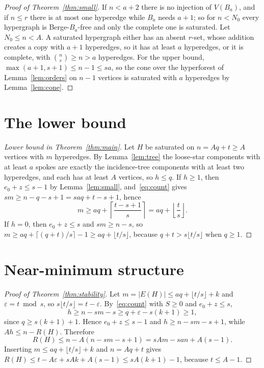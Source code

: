 \documentclass[11pt]{article}
\theoremstyle{definition}
\theoremstyle{remark}
\begin{document}
\begin{proof}[Proof of Theorem~\ref{thm:small}]
If $n<a+2$ there is no injection of $V(B_a)$, and if $n\le r$ there is at
most one hyperedge while $B_a$ needs $a+1$; so for $n<N_0$ every
hypergraph is Berge-$B_a$-free and only the complete one is saturated. Let
$N_0\le n<A$. A saturated hypergraph either has an absent $r$-set, whose
addition creates a copy with $a+1$ hyperedges, so it has at least $a$
hyperedges, or it is complete, with $\binom nr\ge n>a$ hyperedges. For the
upper bound, $\max(a+1,s+1)\le n-1\le sa$, so the cone over the hyperforest
of Lemma~\ref{lem:orders} on $n-1$ vertices is saturated with $a$
hyperedges by Lemma~\ref{lem:cone}.
\end{proof}

\section{The lower bound}

\begin{proof}[Lower bound in Theorem~\ref{thm:main}]
Let $H$ be saturated on $n=Aq+t\ge A$ vertices with $m$ hyperedges. By
Lemma~\ref{lem:tree} the loose-star components with at least $a$ spokes
are exactly the incidence-tree components with at least two hyperedges, and
each has at least $A$ vertices, so $h\le q$. If $h\ge1$, then
$e_0+z\le s-1$ by Lemma~\ref{lem:small}, and~\eqref{eq:count} gives
$sm\ge n-q-s+1=saq+t-s+1$, hence
\[
m\ge aq+\left\lceil\frac{t-s+1}{s}\right\rceil=aq+\left\lfloor\frac
ts\right\rfloor .
\]
If $h=0$, then $e_0+z\le s$ and $sm\ge n-s$, so $m\ge aq+\lceil
(q+t)/s\rceil-1\ge aq+\lfloor t/s\rfloor$, because $q+t>s\lfloor t/s\rfloor$
when $q\ge1$.
\end{proof}

\section{Near-minimum structure}

\begin{proof}[Proof of Theorem~\ref{thm:stability}]
Let $m=|E(H)|\le aq+\lfloor t/s\rfloor+k$ and $\varepsilon=t\bmod s$, so
$s\lfloor t/s\rfloor=t-\varepsilon$. By~\eqref{eq:count} with $S\ge0$ and
$e_0+z\le s$,
\[
h\ge n-sm-s\ge q+\varepsilon-s(k+1)\ge1,
\]
since $q\ge s(k+1)+1$. Hence $e_0+z\le s-1$ and $h\ge n-sm-s+1$, while
$Ah\le n-R(H)$. Therefore
\[
R(H)\le n-A(n-sm-s+1)=sAm-san+A(s-1).
\]
Inserting $m\le aq+\lfloor t/s\rfloor+k$ and $n=Aq+t$ gives $R(H)\le
t-A\varepsilon+sAk+A(s-1)\le sA(k+1)-1$, because $t\le A-1$.
\end{proof}
\end{document}

